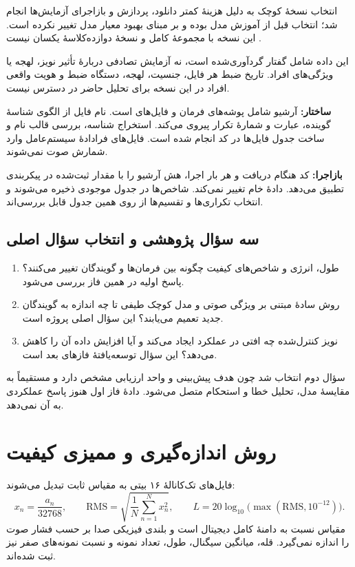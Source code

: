 \documentclass[11pt,a4paper]{article}
\begin{document}
انتخاب نسخهٔ کوچک به دلیل هزینهٔ کمتر دانلود، پردازش و بازاجرای آزمایش‌ها انجام شد؛ انتخاب قبل از آموزش مدل بوده و بر مبنای بهبود معیار مدل تغییر نکرده است. این نسخه با مجموعهٔ کامل و نسخهٔ دوازده‌کلاسهٔ  یکسان نیست \cite{tfds}.

این داده شامل گفتار گردآوری‌شده است، نه آزمایش تصادفی دربارهٔ تأثیر نویز، لهجه یا ویژگی‌های افراد. تاریخ ضبط هر فایل، جنسیت، لهجه، دستگاه ضبط و هویت واقعی افراد در این نسخه برای تحلیل حاضر در دسترس نیست.

\textbf{ساختار:} آرشیو شامل پوشه‌های فرمان و فایل‌های  است. نام فایل از الگوی شناسهٔ گوینده، عبارت  و شمارهٔ تکرار پیروی می‌کند. استخراج شناسه، بررسی قالب نام و ساخت جدول فایل‌ها در کد انجام شده است. فایل‌های فرادادهٔ سیستم‌عامل وارد شمارش صوت نمی‌شوند.

\textbf{بازاجرا:} کد هنگام دریافت و هر بار اجرا، هش  آرشیو را با مقدار ثبت‌شده در پیکربندی تطبیق می‌دهد. دادهٔ خام تغییر نمی‌کند. شاخص‌ها در جدول موجودی ذخیره می‌شوند و انتخاب تکراری‌ها و تقسیم‌ها از روی همین جدول قابل بررسی‌اند.

\subsection{سه سؤال پژوهشی و انتخاب سؤال اصلی}
\begin{enumerate}
\item طول، انرژی و شاخص‌های کیفیت چگونه بین فرمان‌ها و گویندگان تغییر می‌کنند؟ پاسخ اولیه در همین فاز بررسی می‌شود.
\item روش سادهٔ مبتنی بر ویژگی صوتی و مدل کوچک طیفی تا چه اندازه به گویندگان جدید تعمیم می‌یابند؟ این سؤال اصلی پروژه است.
\item نویز کنترل‌شده چه افتی در عملکرد ایجاد می‌کند و آیا افزایش داده آن را کاهش می‌دهد؟ این سؤال توسعه‌یافتهٔ فازهای بعد است.
\end{enumerate}
سؤال دوم انتخاب شد چون هدف پیش‌بینی و واحد ارزیابی مشخص دارد و مستقیماً به مقایسهٔ مدل، تحلیل خطا و استحکام متصل می‌شود. دادهٔ فاز اول هنوز پاسخ عملکردی به آن نمی‌دهد.

\newpage
\section{روش اندازه‌گیری و ممیزی کیفیت}
فایل‌های  تک‌کانالهٔ ۱۶ بیتی به مقیاس ثابت تبدیل می‌شوند:
\begin{equation}
x_n=\frac{a_n}{32768},\qquad
\mathrm{RMS}=\sqrt{\frac{1}{N}\sum_{n=1}^{N}x_n^2},\qquad
L=20\log_{10}\bigl(\max(\mathrm{RMS},10^{-12})\bigr).
\end{equation}
مقیاس  نسبت به دامنهٔ کامل دیجیتال است و بلندی فیزیکی صدا بر حسب فشار صوت را اندازه نمی‌گیرد. قله، میانگین سیگنال، طول، تعداد نمونه و نسبت نمونه‌های صفر نیز ثبت شده‌اند.
\end{document}
